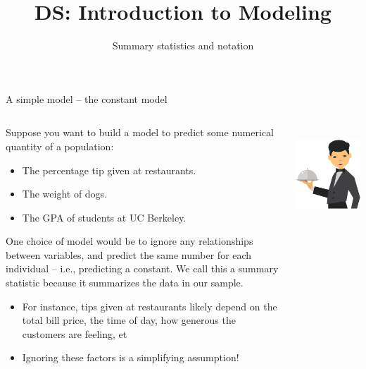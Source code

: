 \documentclass[aspectratio=169]{../latex_main/tntbeamer}  %
\title[Introduction]{DS: Introduction to Modeling}
\subtitle{Summary statistics and notation}
\begin{document}
	
	\maketitle
	\begin{frame}{A simple model – the constant model}
	\begin{columns}
	  \begin{column}{.8\textwidth}
	    Suppose you want to build a model to predict some numerical quantity of a population:\\
	    \begin{itemize}
	        \item The percentage tip given at restaurants.
	        \item The weight of dogs.
	        \item The GPA of students at UC Berkeley.
	    \end{itemize}
	    One choice of model would be to ignore any relationships between variables, and predict the same number for each individual – i.e., predicting a constant. We call this a summary statistic because it summarizes the data in our sample.
	    \begin{itemize}
	        \item For instance, tips given at restaurants likely depend on the total bill price, the time of day, how generous the customers are feeling, et
	        \item Ignoring these factors is a simplifying assumption!
	    \end{itemize}
	  \end{column}
	  
	  
	  \begin{column}{.2\textwidth}
	          \\
	          \vspace{1cm}
	          \includegraphics[scale=.5]{Bild17}
	  \end{column}
	\end{columns}
	\end{frame}
	
\end{document}
